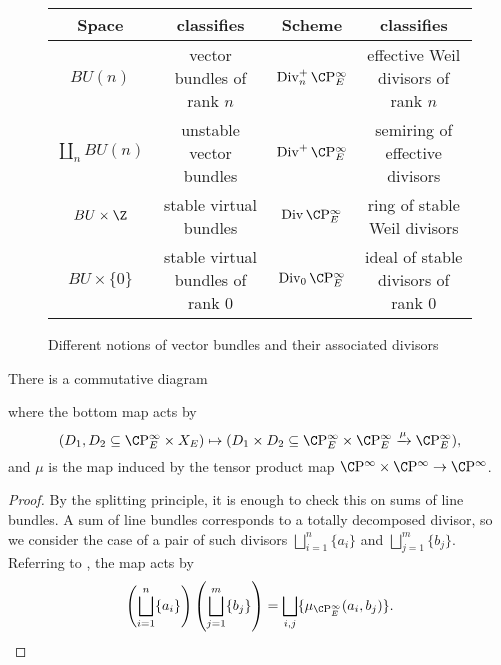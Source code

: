 \begin{figure}
\begin{center}
\begin{tabular}{|c|c||c|c|}
\hline
Space & classifies & Scheme & classifies \\
\hline \hline
$BU(n)$ & vector bundles of rank $n$ & $\Div_n^+ \CP^\infty_E$ & effective Weil divisors of rank $n$ \\
$\coprod_n BU(n)$ & unstable vector bundles & $\Div^+ \CP^\infty_E$ & semiring of effective divisors \\
$BU \times \Z$ & stable virtual bundles & $\Div \CP^\infty_E$ & ring of stable Weil divisors \\
$BU \times \{0\}$ & stable virtual bundles of rank $0$ & $\Div_0 \CP^\infty_E$ & ideal of stable divisors of rank $0$ \\
\hline
\end{tabular}
\end{center}
\caption{Different notions of vector bundles and their associated divisors}
\end{figure}

\begin{corollary}
There is a commutative diagram
\begin{center}
\end{center}
where the bottom map acts by \[(D_1, D_2 \subseteq \CP^\infty_E \times X_E) \mapsto (D_1 \times D_2 \subseteq \CP^\infty_E \times \CP^\infty_E \xrightarrow{\mu} \CP^\infty_E),\] and $\mu$ is the map induced by the tensor product map $\CP^\infty \times \CP^\infty \to \CP^\infty$.
\end{corollary}
\begin{proof}
By the splitting principle, it is enough to check this on sums of line bundles.  A sum of line bundles corresponds to a totally decomposed divisor, so we consider the case of a pair of such divisors $\bigsqcup_{i=1}^n \{a_i\}$ and $\bigsqcup_{j=1}^m \{b_j\}$.  Referring to , the map acts by \[\left(\bigsqcup_{i=1}^n \{a_i\} \right) \left( \bigsqcup_{j=1}^m \{b_j\} \right) = \bigsqcup_{i, j} \{\mu_{\CP^\infty_E}(a_i, b_j)\}. \qedhere\]
\end{proof}


